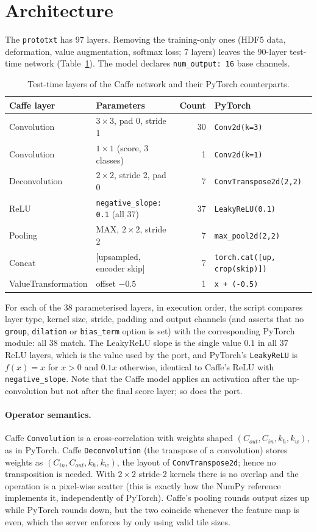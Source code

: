 \documentclass[11pt,a4paper]{article}
\begin{document}
\section{Architecture}
The \texttt{prototxt} has 97 layers. Removing the training-only ones (HDF5 data, deformation, value augmentation, softmax loss; 7 layers) leaves the 90-layer test-time network (Table~\ref{tab:layers}). The model declares \texttt{num\_output: 16} base channels.

\begin{table}[h]\centering
\caption{Test-time layers of the Caffe network and their PyTorch counterparts.}\label{tab:layers}
\begin{tabular}{llr l}\toprule
Caffe layer & Parameters & Count & PyTorch\\\midrule
Convolution & $3{\times}3$, pad 0, stride 1 & 30 & \texttt{Conv2d(k=3)}\\
Convolution & $1{\times}1$ (score, 3 classes) & 1 & \texttt{Conv2d(k=1)}\\
Deconvolution & $2{\times}2$, stride 2, pad 0 & 7 & \texttt{ConvTranspose2d(2,2)}\\
ReLU & \texttt{negative\_slope: 0.1} (all 37) & 37 & \texttt{LeakyReLU(0.1)}\\
Pooling & MAX, $2{\times}2$, stride 2 & 7 & \texttt{max\_pool2d(2,2)}\\
Concat & [upsampled, encoder skip] & 7 & \texttt{torch.cat([up, crop(skip)])}\\
ValueTransformation & offset $-0.5$ & 1 & \texttt{x + (-0.5)}\\\bottomrule
\end{tabular}
\end{table}

For each of the 38 parameterised layers, in execution order, the script compares layer type, kernel size, stride, padding and output channels (and asserts that no \texttt{group}, \texttt{dilation} or \texttt{bias\_term} option is set) with the corresponding PyTorch module: all 38 match. The LeakyReLU slope is the single value $0.1$ in all 37 ReLU layers, which is the value used by the port, and PyTorch's \texttt{LeakyReLU} is $f(x)=x$ for $x>0$ and $0.1x$ otherwise, identical to Caffe's ReLU with \texttt{negative\_slope}. Note that the Caffe model applies an activation after the up-convolution but not after the final score layer; so does the port.

\paragraph{Operator semantics.} Caffe \texttt{Convolution} is a cross-correlation with weights shaped $(C_{out},C_{in},k_h,k_w)$, as in PyTorch. Caffe \texttt{Deconvolution} (the transpose of a convolution) stores weights as $(C_{in},C_{out},k_h,k_w)$, the layout of \texttt{ConvTranspose2d}; hence no transposition is needed. With $2{\times}2$ stride-2 kernels there is no overlap and the operation is a pixel-wise scatter (this is exactly how the NumPy reference implements it, independently of PyTorch). Caffe's pooling rounds output sizes up while PyTorch rounds down, but the two coincide whenever the feature map is even, which the server enforces by only using valid tile sizes.
\end{document}

